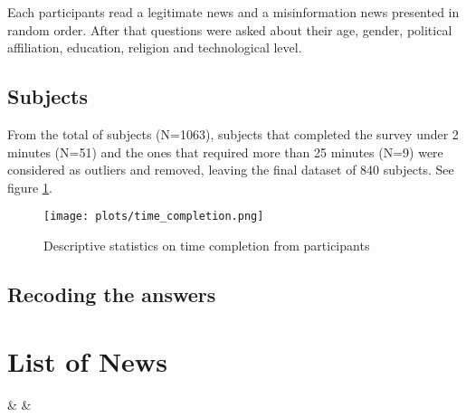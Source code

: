 \documentclass{article}
\begin{document}



Each participants read a legitimate news and a misinformation news presented in random order. After that questions were asked about their age, gender, political affiliation, education, religion and technological level.


\subsection{Subjects}
\label{ssec:subjects}

From the total of subjects (N=1063), subjects that completed the survey under 2 minutes (N=51) and the ones that required more than 25 minutes (N=9) were considered as outliers and removed, leaving the final dataset of 840 subjects. See figure \ref{fig:participants_time_completion}.

\begin{figure}[hbt]
    \centering
    \texttt{[image: plots/time\_completion.png]}
    \caption{Descriptive statistics on time completion from participants}
    \label{fig:participants_time_completion}
\end{figure}


\subsection{Recoding the answers}



\appendix

\section{List of News}
\label{sec:list_news}


%
{\csvcoli & \csvcolii & \csvcoliii}
\end{document}
